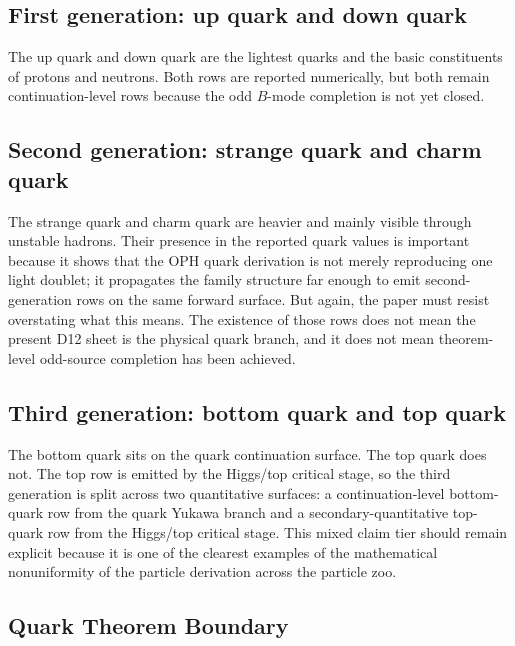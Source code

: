\documentclass[11pt]{article}
\begin{document}
\subsection{First generation: up quark and down quark}

The up quark and down quark are the lightest quarks and the basic constituents of protons and
neutrons. Both rows are reported numerically, but both remain continuation-level rows because the
odd \(B\)-mode completion is not yet closed.

\subsection{Second generation: strange quark and charm quark}

The strange quark and charm quark are heavier and mainly visible through unstable hadrons. Their
presence in the reported quark values is important because it shows that the OPH quark
derivation is not merely reproducing one light doublet; it propagates the family structure far
enough to emit second-generation rows on the same forward surface. But again, the paper
must resist overstating what this means. The existence of those rows does not mean the present D12
sheet is the physical quark branch, and it does not mean theorem-level odd-source completion has
been achieved.

\subsection{Third generation: bottom quark and top quark}

The bottom quark sits on the quark continuation surface. The top quark does not. The top
row is emitted by the Higgs/top critical stage, so the third generation is split across two quantitative
surfaces: a continuation-level bottom-quark row from the quark Yukawa branch and a
secondary-quantitative top-quark row from the Higgs/top critical stage. This mixed claim tier
should remain explicit because it is one of the clearest examples of the mathematical
nonuniformity of the particle derivation across the particle zoo.

\subsection{Quark Theorem Boundary}\label{quark-family-open-closures}
\end{document}
